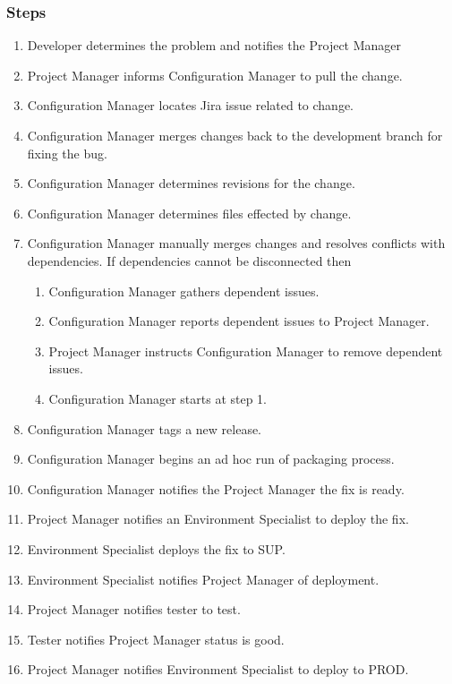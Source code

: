 \documentclass[12pt,notitlepage]{article}
\begin{document}
\subsubsection{Steps}
\begin{enumerate}
\item Developer determines the problem and notifies the Project Manager
\item Project Manager informs Configuration Manager to pull the change.
\item Configuration Manager locates Jira issue related to change.
\item Configuration Manager merges changes back to the development branch for fixing the bug.
\item Configuration Manager determines revisions for the change.
\item Configuration Manager determines files effected by change.
\item Configuration Manager manually merges changes and resolves conflicts with dependencies. If 
  dependencies cannot be disconnected then
  \begin{enumerate}
    \item Configuration Manager gathers dependent issues.
    \item Configuration Manager reports dependent issues to Project Manager.
    \item Project Manager instructs Configuration Manager to remove dependent issues.
    \item Configuration Manager starts at step 1.
  \end{enumerate}
\item Configuration Manager tags a new release.
\item Configuration Manager begins an ad hoc run of packaging process.
\item Configuration Manager notifies the Project Manager the fix is ready.
\item Project Manager notifies an Environment Specialist to deploy the fix.
\item Environment Specialist deploys the fix to SUP.
\item Environment Specialist notifies Project Manager of deployment.
\item Project Manager notifies tester to test.
\item Tester notifies Project Manager status is good.
\item Project Manager notifies Environment Specialist to deploy to PROD.
\end{enumerate}
\end{document}
